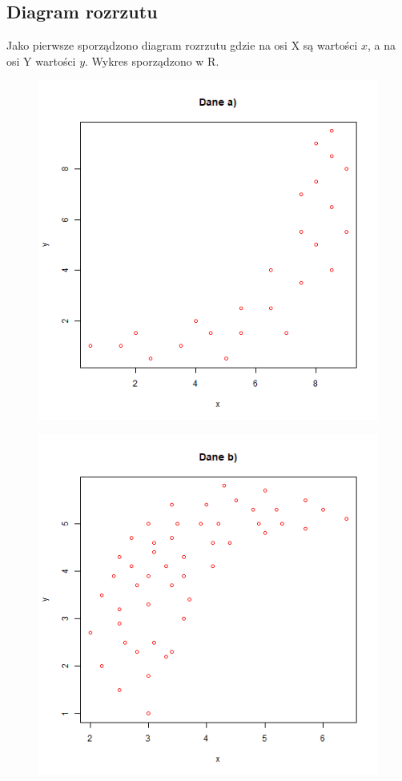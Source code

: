 \documentclass{article}
\begin{document}
\subsection{Diagram rozrzutu}
Jako pierwsze sporządzono diagram rozrzutu gdzie na osi X są wartości $x$, a na osi Y wartości $y$. Wykres sporządzono w R.
\begin{figure}[h!]
\begin{center}
\includegraphics[height = 0.4\textheight, angle = 0]{"w11zad1a.png"}
\end{center} \end{figure} 

\newpage
\begin{figure}[h!]
\begin{center}
\includegraphics[height = 0.4\textheight, angle = 0]{"w11zad1b.png"}
\end{center} \end{figure} 
\end{document}
